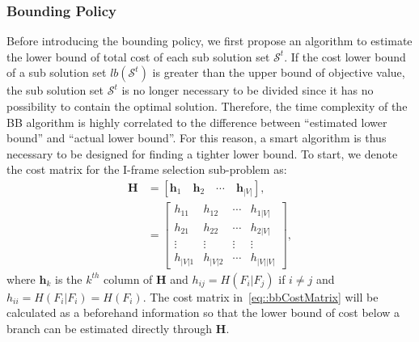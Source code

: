 \subsubsection{Bounding Policy}
\label{sec::proposedBBBoundingPolicy}
Before introducing the bounding policy, we first propose an algorithm to estimate the lower bound of total cost of each sub solution set $\mathcal{S}^t$.
If the cost lower bound of a sub solution set $lb(\mathcal{S}^t)$ is greater than the upper bound of objective value, the sub solution set $\mathcal{S}^t$ is no longer necessary to be divided since it has no possibility to contain the optimal solution.
Therefore, the time complexity of the BB algorithm is highly correlated to the difference between ``estimated lower bound'' and ``actual lower bound''.
For this reason, a smart algorithm is thus necessary to be designed for finding a tighter lower bound.
To start, we denote the cost matrix for the I-frame selection sub-problem as:
\begin{align}
\mathbf{H}
&= \left[ \mathbf{h}_1 \quad \mathbf{h}_2 \quad \cdots \quad \mathbf{h}_{|V|} \right], \nonumber \\
&= \left[ \begin{array}{cccc}
h_{11} &h_{12} &\cdots &h_{1|V|} \\
h_{21} &h_{22} &\cdots &h_{2|V|} \\
\vdots &\vdots &\vdots &\vdots \\
h_{|V|1} &h_{|V|2} &\cdots &h_{|V||V|}
\end{array} \right],
\label{eq::bbCostMatrix}
\end{align}
where $\mathbf{h}_k$ is the $k^{th}$ column of $\mathbf{H}$ and ${h_{ij} = H(F_i|F_j)}$ if ${i \neq j}$ and ${h_{ii}=H(F_i|F_i)=H(F_i)}$.
The cost matrix in~\eqref{eq::bbCostMatrix} will be calculated as a beforehand information so that the lower bound of cost below a branch can be estimated directly through $\mathbf{H}$.

